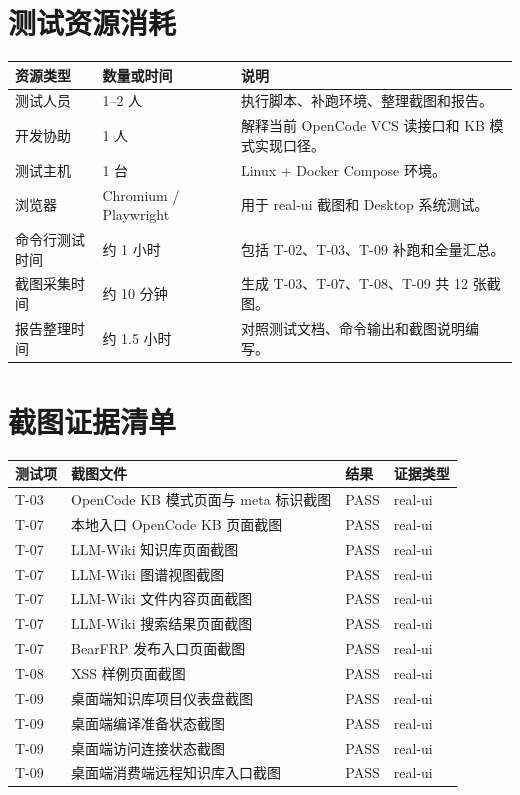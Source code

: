 \documentclass[UTF8,a4paper,12pt,fontset=fandol]{ctexart}
\begin{document}
\section{测试资源消耗}
\begin{longtable}{p{3.0cm}p{3.0cm}p{8.3cm}}
\toprule
资源类型 & 数量或时间 & 说明 \\
\midrule
测试人员 & 1--2 人 & 执行脚本、补跑环境、整理截图和报告。 \\
开发协助 & 1 人 & 解释当前 OpenCode VCS 读接口和 KB 模式实现口径。 \\
测试主机 & 1 台 & Linux + Docker Compose 环境。 \\
浏览器 & Chromium / Playwright & 用于 real-ui 截图和 Desktop 系统测试。 \\
命令行测试时间 & 约 1 小时 & 包括 T-02、T-03、T-09 补跑和全量汇总。 \\
截图采集时间 & 约 10 分钟 & 生成 T-03、T-07、T-08、T-09 共 12 张截图。 \\
报告整理时间 & 约 1.5 小时 & 对照测试文档、命令输出和截图说明编写。 \\
\bottomrule
\end{longtable}

\appendix
\section{截图证据清单}
\begin{longtable}{p{1.6cm}p{8.2cm}p{2.0cm}p{2.2cm}}
\toprule
测试项 & 截图文件 & 结果 & 证据类型 \\
\midrule
T-03 & OpenCode KB 模式页面与 meta 标识截图 & PASS & real-ui \\
T-07 & 本地入口 OpenCode KB 页面截图 & PASS & real-ui \\
T-07 & LLM-Wiki 知识库页面截图 & PASS & real-ui \\
T-07 & LLM-Wiki 图谱视图截图 & PASS & real-ui \\
T-07 & LLM-Wiki 文件内容页面截图 & PASS & real-ui \\
T-07 & LLM-Wiki 搜索结果页面截图 & PASS & real-ui \\
T-07 & BearFRP 发布入口页面截图 & PASS & real-ui \\
T-08 & XSS 样例页面截图 & PASS & real-ui \\
T-09 & 桌面端知识库项目仪表盘截图 & PASS & real-ui \\
T-09 & 桌面端编译准备状态截图 & PASS & real-ui \\
T-09 & 桌面端访问连接状态截图 & PASS & real-ui \\
T-09 & 桌面端消费端远程知识库入口截图 & PASS & real-ui \\
\bottomrule
\end{longtable}
\end{document}
